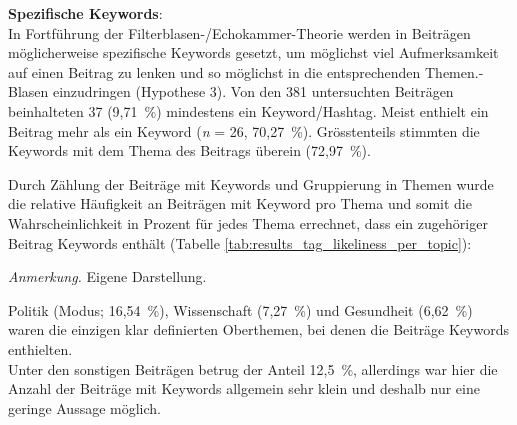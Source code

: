 \documentclass[12pt,a4paper]{article}        %
\begin{document}
\textbf{Spezifische Keywords}: \\
In Fortführung der Filterblasen-/Echokammer-Theorie \parencites[vgl.\ bspw.][8]{zoglauer_konstruierte_2021}[222]{schmidt_meinungsbildung_2022}[195]{krafft_disinformation_2020}[8]{grujic_warnhinweise_2024}[221]{allcott_social_2017} werden in Beiträgen möglicherweise spezifische Keywords gesetzt, um möglichst viel Aufmerksamkeit auf einen Beitrag zu lenken und so möglichst in die entsprechenden Themen.-Blasen einzudringen (Hypothese 3).
Von den 381 untersuchten Beiträgen beinhalteten 37 (9,71 \%) mindestens ein Keyword/Hashtag. Meist enthielt ein Beitrag mehr als ein Keyword (\textit{n} = 26, 70,27 \%). Grösstenteils stimmten die Keywords mit dem Thema des Beitrags überein (72,97 \%).

Durch Zählung der Beiträge mit Keywords und Gruppierung in Themen wurde die relative Häufigkeit an Beiträgen mit Keyword pro Thema und somit die Wahrscheinlichkeit in Prozent für jedes Thema errechnet, dass ein zugehöriger Beitrag Keywords enthält (Tabelle \ref{tab:results_tag_likeliness_per_topic}):
\begin{table}[H]
  \caption{\textit{Relative Häufigkeit der Beiträge mit Keyword pro Themengebiet}}
  \label{tab:results_tag_likeliness_per_topic}
  \centering
  \footnotesize\textit{Anmerkung.} Eigene Darstellung.
\end{table}
Politik (Modus; 16,54 \%), Wissenschaft (7,27 \%) und Gesundheit (6,62 \%) waren die einzigen klar definierten Oberthemen, bei denen die Beiträge Keywords enthielten. \\
Unter den sonstigen Beiträgen betrug der Anteil 12,5 \%, allerdings war hier die Anzahl der Beiträge mit Keywords allgemein sehr klein und deshalb nur eine geringe Aussage möglich.
\end{document}
